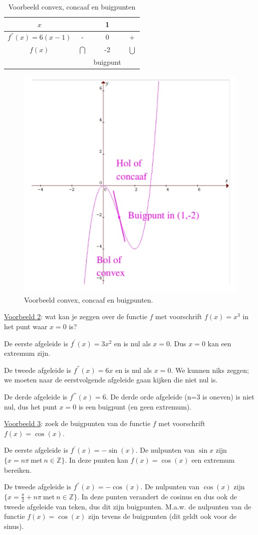 \begin{table}
	\centering
	\begin{tabular}{c||c|c|c}
		$x$ &  & 1 & \tabularnewline
		\hline 
		$f^{''}(x)=6(x-1)$ & - & 0 & +\\
		\hline 
		$f(x)$ & $\bigcap$ & -2 & $\bigcup$\\
		&  & buigpunt & \\
	\end{tabular}
\caption{Voorbeeld convex, concaaf en buigpunten}
\label{tab:convex}
\end{table}

\begin{figure}[h]
\centering{}\includegraphics[width=.7\linewidth]{2_elem_rekenvaardigheden_B/inputs/verloop_vb3.jpg} 
\caption{Voorbeeld convex, concaaf en buigpunten.}
\label{fig:vb3}
\end{figure}

\noindent \uline{Voorbeeld 2}: wat kan je zeggen over de functie $f$ met voorschrift
$f(x)=x^{3}$ in het punt waar $x=0$ is?

\noindent De eerste afgeleide is $f^{'}(x)=3x^{2}$ en is nul als
$x=0$. Dus $x=0$ kan een extremum zijn.

\noindent De tweede afgeleide is $f^{''}(x)=6x$ en is nul als $x=0$.
We kunnen niks zeggen; we moeten naar de eerstvolgende afgeleide gaan
kijken die niet nul is.

\noindent De derde afgeleide is $f^{'''}(x)=6$. De derde orde afgeleide
(n=3 is oneven) is niet nul, dus het punt $x=0$ is een buigpunt (en
geen extremum).

\medskip{}


\noindent \uline{Voorbeeld 3}: zoek de buigpunten van de functie $f$ met voorschrift
$f(x)=\cos(x)$.

\noindent De eerste afgeleide is $f^{'}(x)=-\sin(x)$. De nulpunten
van $\sin x$ zijn $\{x=n\pi\:\textrm{met}\:n\in\mathbb{Z}\}$. In
deze punten kan $f(x)=\cos(x)$ een extremum bereiken.

\noindent De tweede afgeleide is $f^{''}(x)=-\cos(x)$. De nulpunten
van $\cos(x)$ zijn $\{x=\frac{\pi}{2}+n\pi\:\textrm{met}\:n\in\mathbb{Z}\}$.
In deze punten verandert de cosinus en dus ook de tweede afgeleide
van teken, dus dit zijn buigpunten. M.a.w. de nulpunten van de functie
$f(x)=\cos(x)$ zijn tevens de buigpunten (dit geldt ook voor de sinus).
